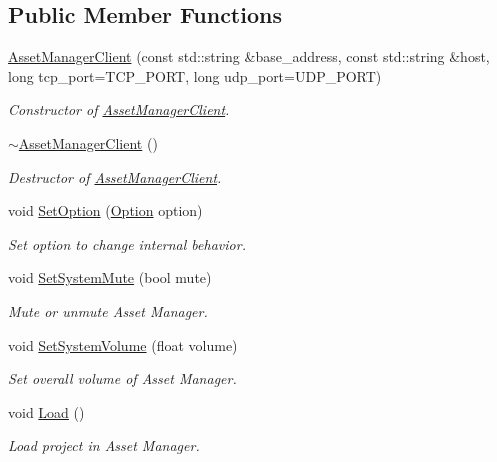 \subsection*{Public Member Functions}
\begin{DoxyCompactItemize}
\item 
\hyperlink{classam_1_1_asset_manager_client_aef19f13fdc5939ddb53ec80f79f7dc1f}{AssetManagerClient} (const std::string \&base\_\-address, const std::string \&host, long tcp\_\-port=TCP\_\-PORT, long udp\_\-port=UDP\_\-PORT)
\begin{DoxyCompactList}\small\item\em Constructor of {\itshape \hyperlink{classam_1_1_asset_manager_client}{AssetManagerClient}\/}. \end{DoxyCompactList}\item 
\hyperlink{classam_1_1_asset_manager_client_af815a4a3a82b47ba39fa688819d5cb3d}{$\sim$AssetManagerClient} ()
\begin{DoxyCompactList}\small\item\em Destructor of {\itshape \hyperlink{classam_1_1_asset_manager_client}{AssetManagerClient}\/}. \end{DoxyCompactList}\item 
void \hyperlink{classam_1_1_asset_manager_client_a9b305a3d9362bdacbf0b676df39474c5}{SetOption} (\hyperlink{classam_1_1_asset_manager_client_a46c830784e6b2983faa4764d1cad8204}{Option} option)
\begin{DoxyCompactList}\small\item\em Set option to change internal behavior. \end{DoxyCompactList}\item 
void \hyperlink{classam_1_1_asset_manager_client_a42894c6bff07e22fb9598e1c089779a6}{SetSystemMute} (bool mute)
\begin{DoxyCompactList}\small\item\em Mute or unmute Asset Manager. \end{DoxyCompactList}\item 
void \hyperlink{classam_1_1_asset_manager_client_a22b644bd78df97d01a08ef4d36bd60bc}{SetSystemVolume} (float volume)
\begin{DoxyCompactList}\small\item\em Set overall volume of Asset Manager. \end{DoxyCompactList}\item 
void \hyperlink{classam_1_1_asset_manager_client_a185b1f7d9a2953b05699dcc9cdfc8a6c}{Load} ()
\begin{DoxyCompactList}\small\item\em Load project in Asset Manager. \end{DoxyCompactList}\item 

\end{DoxyCompactItemize}
